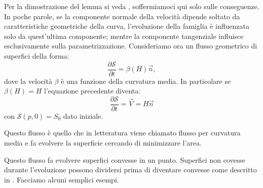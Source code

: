 Per la dimostrazione del lemma si veda \cite[][]{gui:sapiro}, soffermiamoci qui solo sulle conseguenze.
In poche parole, se la componente normale della velocità dipende soltato da caratteristiche geometriche della curva, l'evoluzione della famiglia è influenzata solo da quest'ultima componente; mentre la componente tangenziale influisce esclusivamente sulla parametrizzazione.
Consideriamo ora un flusso geometrico di superfici della forma:
\[
\frac{\partial\mathcal{S}}{\partial t} = \beta(H)\vec{n},
\] 
dove la velocità $\beta$ è una funzione della curvatura media. In particolare se $\beta(H)=H$ l'equazione precedente diventa:
\begin{equation}
  \label{eq:cp-123}
  \frac{\partial\mathcal{S}}{\partial t} = \vec{V} = H\vec{n}
\end{equation}
con $\mathcal{S}(p,0)=S_0$ dato iniziale.
\begin{osservazione}
Questo flusso è quello che in letteratura viene chiamato
flusso per curvatura media e fa evolvere la  superficie cercando di
minimizzare l'area.  
\end{osservazione}
\begin{osservazione}
Questo flusso fa evolvere superfici convesse in un punto. Superfici
non covesse durante l'evoluzione possono dividersi prima di diventare
convesse come descritto in \cite[][]{gui:sapiro}. Facciamo alcuni
semplici esempi. 
\end{osservazione}

